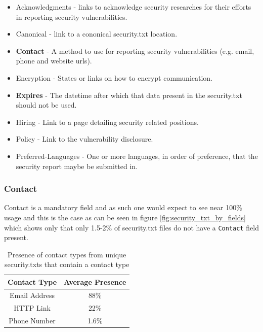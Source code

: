 \documentclass{mscreport}
\begin{document}
\begin{itemize}
	\setlength\itemsep{0.1em}
    \item Acknowledgments - links to acknowledge security researches for their efforts in reporting security vulnerabilities.
    \item Canonical - link to a cononical security.txt location.
    \item \textbf{Contact} - A method to use for reporting security vulnerabilities (e.g. email, phone and website urls).
    \item Encryption - States or links on how to encrypt communication.
    \item \textbf{Expires} - The datetime after which that data present in the security.txt should not be used.
    \item Hiring - Link to a page detailing security related positions.
    \item Policy - Link to the vulnerability disclosure.
    \item Preferred-Languages - One or more languages, in order of preference, that the security report maybe be submitted in.
\end{itemize}

\subsubsection{Contact}

\noindent
Contact is a mandatory field and as such one would expect to see near 100\% usage and this is the case as can be seen in figure \ref{fig:security_txt_by_fields} which shows only that only 1.5-2\% of security.txt files do not have a \texttt{Contact} field present.

\begin{table}[H]
  \begin{center}
    \begin{tabular}{|c|c|}  %
      \hline
      \textbf{Contact Type} & \textbf{Average Presence}\\
      \hline
      Email Address & 88\%\\
      \hline
      HTTP Link & 22\%\\
      \hline
      Phone Number & 1.6\%\\
      \hline
    \end{tabular}
    \caption{Presence of contact types from unique security.txts that contain a contact type}
    \label{table:security_txt_by_contact_type} %
  \end{center}
\end{table}
\end{document}
